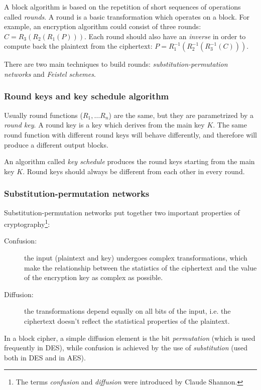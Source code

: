 \documentclass{article}
\begin{document}
  A block algorithm is based on the repetition of short sequences of
  operations called \emph{rounds}.
  A round is a basic transformation which operates on a block. For
  example, an encryption algorithm could consist of three rounds: $C =
  R_{3} (R_{2}(R_{1}(P)))$. Each round should also have an
  \emph{inverse} in order to compute back the plaintext from the
  ciphertext: $P = R_{1}^{-1} (R_{2}^{-1}(R_{3}^{-1}(C)))$.
  
  There are two main techniques to build rounds:
  \emph{substitution-permutation networks} and \emph{Feistel
  schemes}.


  \subsubsection{Round keys and key schedule algorithm}

  Usually round functions ($R_{1},\dots R_{n}$) are the same, but they
  are parametrized by a \emph{round key}.
  A round key is a key which derives from the main key $K$.
  The same round function with different round keys will behave
  differently, and therefore will produce a different output blocks.

  An algorithm called \emph{key schedule} produces the round keys
  starting from the main key $K$.
  Round keys should always be different from each other in every round.
  

  \subsubsection{Substitution-permutation networks}  

  Substitution-permutation networks put together two important
  properties of cryptography\footnote{The terms \emph{confusion} and
  \emph{diffusion} were introduced by Claude Shannon.}:

  \begin{description}
	\item[Confusion:] the input (plaintext and key) undergoes
	  complex transformations, which make the relationship between the
	  statistics of the ciphertext and the value of the encryption key
	  as complex as possible. 
	\item[Diffusion:] the transformations depend equally on all bits
	  of the input, i.e. the ciphertext doesn't reflect the
	  statistical properties of the plaintext.
  \end{description}

  In a block cipher, a simple diffusion element is the bit
  \emph{permutation} (which is used frequently in DES),
  while confusion is achieved
  by the use of \emph{substitution} (used both in DES and in AES).
\end{document}
